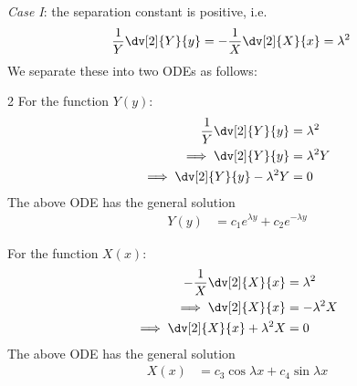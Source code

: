 \begin{enumerate}
            \textit{Case I}: the separation constant is positive, i.e.
            \begin{align*}
                \dfrac{1}{Y}\dv[2]{Y}{y}&=-\dfrac{1}{X}\dv[2]{X}{x}=\lambda^2
            \end{align*}
            We separate these into two ODEs as follows:
            \begin{multicols}{2}
            \setlength{\columnseprule}{0.4pt}
                For the function $Y(y)$:
                \begin{align*}
                    \dfrac{1}{Y}\dv[2]{Y}{y}&=\lambda^2 \\
                    \implies\dv[2]{Y}{y}&=\lambda^2Y \\
                    \implies\dv[2]{Y}{y}-\lambda^2Y&=0
                \end{align*}
                The above ODE has the general solution
                \begin{align}
                    Y(y)&=c_1e^{\lambda y}+c_2e^{-\lambda y} \label{eqn:lapl:eg-1:y-gen-soln-1}
                \end{align}
                
                \columnbreak
                For the function $X(x)$:
                \begin{align*}
                    -\dfrac{1}{X}\dv[2]{X}{x}&=\lambda^2 \\
                    \implies\dv[2]{X}{x}&=-\lambda^2X \\
                    \implies\dv[2]{X}{x}+\lambda^2X&=0
                \end{align*}
                The above ODE has the general solution
                \begin{align}
                    X(x)&=c_3\cos{\lambda x}+c_4\sin{\lambda x} \label{eqn:lapl:eg-1:x-gen-soln-1}
                \end{align}
                

\end{multicols}
\end{enumerate}
